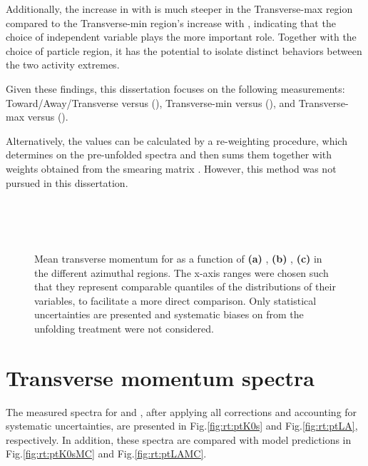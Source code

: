 Additionally, the increase in \meanpt with \NTmax is much steeper in the Transverse-max region compared to the Transverse-min region's increase with \NTmin, indicating that the choice of independent variable plays the more important role. Together with the choice of particle region, it has the potential to isolate distinct behaviors between the two activity extremes.

Given these findings, this dissertation focuses on the following measurements: Toward/Away/Transverse versus \RT (\NT), Transverse-min versus \RTmin (\NTmin), and Transverse-max versus \RTmax (\NTmax).

Alternatively, the \meanpt values can be calculated by a re-weighting procedure, which determines \meanpt on the pre-unfolded spectra and then sums them together with weights obtained from the smearing matrix \cite{alicecollaborationUnderlyingEventProperties2020}. However, this method was not pursued in this dissertation. 

\begin{figure}[H]%
\\
\\
\\
\caption{Mean transverse momentum for \KOs as a function of \textbf{(a)} \NT, \textbf{(b)} \NTmin, \textbf{(c)} \NTmax in the different azimuthal regions. The x-axis ranges were chosen such that they represent comparable quantiles of the distributions of their variables, to facilitate a more direct comparison. Only statistical uncertainties are presented and systematic biases on \meanpt from the unfolding treatment were not considered.}
\label{fig:rt:meanptK0s}
\end{figure}

\section{Transverse momentum spectra}

The measured \pt spectra for \KOs and \LA, after applying all corrections and accounting for systematic uncertainties, are presented in Fig.\ref{fig:rt:ptK0s} and Fig.\ref{fig:rt:ptLA}, respectively. In addition, these spectra are compared with model predictions in Fig.\ref{fig:rt:ptK0sMC} and Fig.\ref{fig:rt:ptLAMC}.

